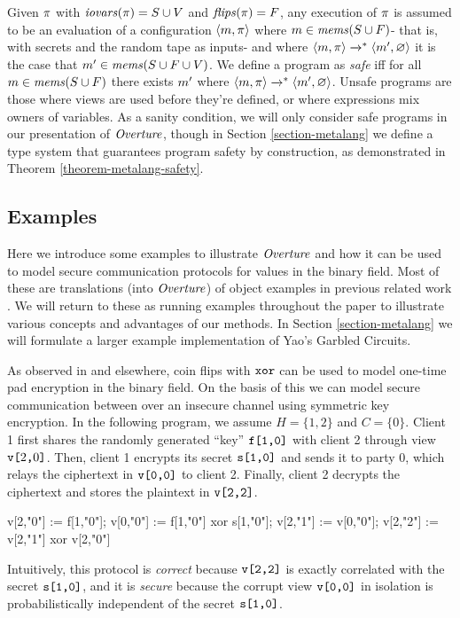 Given $\pi$ with $\mathit{iovars}(\pi) = S \cup V$ and $\mathit{flips}(\pi) = F$,
any execution of $\pi$ is assumed to be an evaluation of a
configuration $\langle m,\pi \rangle$ where $m \in \mathit{mems}(S \cup
F)$- that is, with secrets and the random tape as inputs- and where
$\langle m,\pi \rangle \xrightarrow{}^{*} \langle m',\varnothing \rangle$ it is
the case that $m' \in \mathit{mems}(S \cup F \cup V)$. We define a
program as \emph{safe} iff for all $m \in \mathit{mems}(S \cup F)$ there
exists $m'$ where $\langle m,\pi \rangle \xrightarrow{}^{*}
\langle m',\varnothing \rangle$. Unsafe programs are those where views
are used before they're defined, or where expressions mix owners of
variables. As a sanity condition, we will only consider safe 
programs in our presentation of $\mathit{Overture}$, though in Section
\ref{section-metalang} we define a type system that guarantees
program safety by construction, as demonstrated in Theorem
\ref{theorem-metalang-safety}.

\subsection{Examples}
\label{section-minicat-examples}

Here we introduce some examples to illustrate $\mathit{Overture}$ and how it
can be used to model secure communication protocols for values in the
binary field. Most of these are translations (into $\mathit{Overture}$) of
object examples in previous related work
\cite{barthe2019probabilistic,darais2019language}.  We will return to
these as running examples throughout the paper to illustrate various
concepts and advantages of our methods. In Section
\ref{section-metalang} we will formulate a larger example
implementation of Yao's Garbled Circuits.
\begin{example}
  \label{example-otp}
As observed in \cite{barthe2019probabilistic} and elsewhere, coin flips with $\texttt{xor}$ can
be used to model one-time pad encryption in the binary field. On the
basis of this we can model secure communication between over an
insecure channel using symmetric key encryption. In the following
program, we assume $H = \{ 1,2 \}$ and $C = \{ 0 \}$. Client 1 first
shares the randomly generated ``key'' $\texttt{f[1,0]}$ with client 2
through view $\texttt{v[}2\texttt{,}0\texttt{]}$. Then, client 1 encrypts its secret
$\texttt{s[1,0]}$ and sends it to party 0, which relays the ciphertext in
$\texttt{v[0,0]}$ to client 2. Finally, client 2 decrypts the ciphertext
and stores the plaintext in $\texttt{v[2,2]}$.
\begin{verbatimtab}
v[2,"0"] := f[1,"0"];
v[0,"0"] := f[1,"0"] xor s[1,"0"];
v[2,"1"] := v[0,"0"];
v[2,"2"] := v[2,"1"] xor v[2,"0"]
\end{verbatimtab}
Intuitively, this protocol is \emph{correct} because $\texttt{v[2,2]}$ is
exactly correlated with the secret $\texttt{s[1,0]}$, and it is
\emph{secure} because the corrupt view $\texttt{v[0,0]}$ in isolation is
probabilistically independent of the secret $\texttt{s[1,0]}$.
\end{example}

